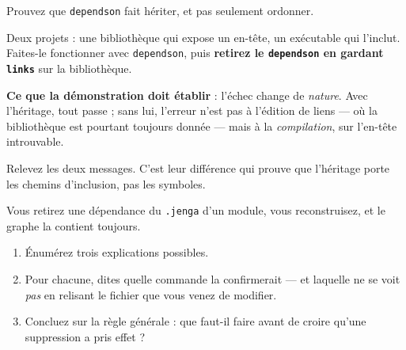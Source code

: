 \begin{nkdemo}
Prouvez que \texttt{dependson} fait hériter, et pas seulement ordonner.

Deux projets : une bibliothèque qui expose un en-tête, un exécutable qui
l'inclut. Faites-le fonctionner avec \texttt{dependson}, puis \textbf{retirez le
\texttt{dependson} en gardant \texttt{links}} sur la bibliothèque.

\textbf{Ce que la démonstration doit établir} : l'échec change de \emph{nature}.
Avec l'héritage, tout passe ; sans lui, l'erreur n'est pas à l'édition de liens
--- où la bibliothèque est pourtant toujours donnée --- mais à la
\emph{compilation}, sur l'en-tête introuvable.

Relevez les deux messages. C'est leur différence qui prouve que l'héritage porte
les chemins d'inclusion, pas les symboles.
\end{nkdemo}

\begin{nklogique}
Vous retirez une dépendance du \texttt{.jenga} d'un module, vous reconstruisez, et
le graphe la contient toujours.

\begin{enumerate}
\item Énumérez trois explications possibles.
\item Pour chacune, dites quelle commande la confirmerait --- et laquelle ne se
      voit \emph{pas} en relisant le fichier que vous venez de modifier.
\item Concluez sur la règle générale : que faut-il faire avant de croire qu'une
      suppression a pris effet ?
\end{enumerate}
\end{nklogique}
